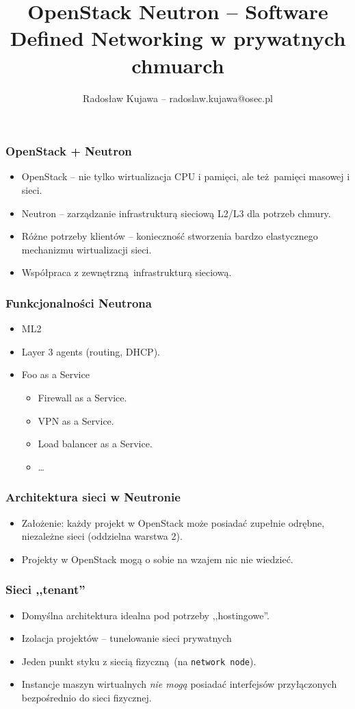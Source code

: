 \documentclass[dvipsnames,table]{beamer}
\title{OpenStack Neutron -- Software Defined Networking w prywatnych chmuarch}
\author{Radosław Kujawa -- radoslaw.kujawa@osec.pl}
\institute{OSEC}
\begin{document}
\begin{frame}
	\titlepage
\end{frame}

\begin{frame}
\frametitle{OpenStack + Neutron}
\begin{itemize}
	\item OpenStack -- nie tylko wirtualizacja CPU i pamięci, ale też pamięci masowej i sieci.
	\item Neutron -- zarządzanie infrastrukturą sieciową L2/L3 dla potrzeb chmury.
	\item Różne potrzeby klientów -- konieczność stworzenia bardzo elastycznego mechanizmu wirtualizacji sieci.
	\item Współpraca z zewnętrzną infrastrukturą sieciową.
\end{itemize}
\end{frame}

\begin{frame}
\frametitle{Funkcjonalności Neutrona}
\begin{itemize}
	\item ML2 
	\item Layer 3 agents (routing, DHCP).
	\item Foo as a Service
	\begin{itemize}
		\item Firewall as a Service.
		\item VPN as a Service.
		\item Load balancer as a Service.
		\item \dots 
	\end{itemize}
\end{itemize}
\end{frame}

\begin{frame}
\frametitle{Architektura sieci w Neutronie}
\begin{itemize}
	\item Założenie: każdy projekt w OpenStack może posiadać zupełnie odrębne, niezależne sieci (oddzielna warstwa 2).
	\item Projekty w OpenStack mogą o sobie na wzajem nic nie wiedzieć.
\end{itemize}
\end{frame}

\begin{frame}
\frametitle{Sieci ,,tenant''}
\begin{itemize}
	\item Domyślna architektura idealna pod potrzeby ,,hostingowe''. 
	\item Izolacja projektów -- tunelowanie sieci prywatnych
	\item Jeden punkt styku z siecią fizyczną (na {\tt network node}).
	\item Instancje maszyn wirtualnych {\em nie mogą} posiadać interfejsów przyłączonych bezpośrednio do sieci fizycznej.
\end{itemize}
\end{frame}
\end{document}
